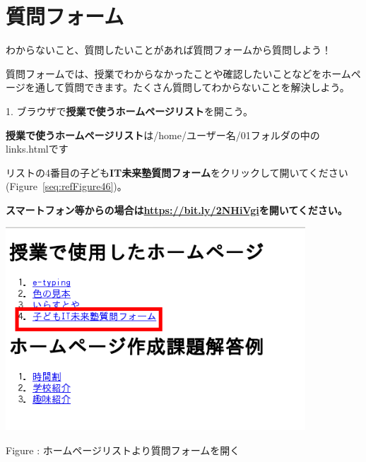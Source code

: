 \documentclass[a4paper,12pt]{jarticle}
\newcounter{Figure}
\renewcommand\theFigure{\arabic{Figure}}
\begin{document}
\bigskip
\bigskip
\bigskip




\clearpage\section{質問フォーム}
わからないこと、質問したいことがあれば質問フォームから質問しよう！

質問フォームでは、授業でわからなかったことや確認したいことなどをホームページを通して質問できます。たくさん質問してわからないことを解決しよう。

\bigskip

\bigskip

1.
ブラウザで\textbf{授業で使うホームページリスト}を開こう。

\bigskip

\textbf{授業で使うホームページリスト}は/home/ユーザー名/01フォルダの中のlinks.htmlです

リストの4番目の子ども\textbf{IT未来塾質問フォーム}をクリックして開いてください(Figure~\ref{seq:refFigure46})。


\bigskip

{\bfseries
スマートフォン等からの場合は\url{https://bit.ly/2NHiVgi}を開いてください。}



\begin{minipage}{9.781cm}
\centering
{\upshape
\includegraphics[width=11.231cm,height=7.613cm]{textbook-img245.png}
\flushleft

\bigskip
Figure {\theFigure\label{seq:refFigure46}}:
ホームページリストより質問フォームを開く}
\end{minipage}

\bigskip
\end{document}
